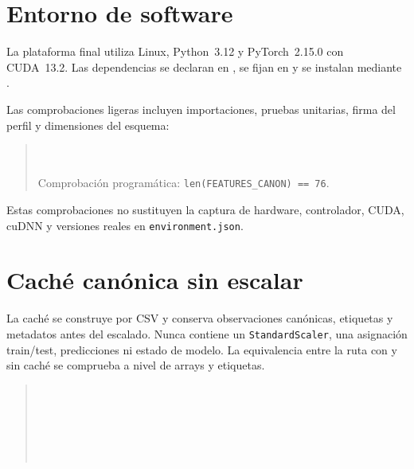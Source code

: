 \section{Entorno de software}

La plataforma final utiliza Linux, Python~3.12 y PyTorch~2.15.0 con CUDA~13.2. Las dependencias se declaran en , se fijan en  y se instalan mediante .

Las comprobaciones ligeras incluyen importaciones, pruebas unitarias, firma del perfil y dimensiones del esquema:

\begin{quote}\small
{}\\
\\
Comprobación programática: \texttt{len(FEATURES\_CANON) == 76}.
\end{quote}

Estas comprobaciones no sustituyen la captura de hardware, controlador, CUDA, cuDNN y versiones reales en \texttt{environment.json}.

\section{Caché canónica sin escalar}

La caché se construye por CSV y conserva observaciones canónicas, etiquetas y metadatos antes del escalado. Nunca contiene un \texttt{StandardScaler}, una asignación train/test, predicciones ni estado de modelo. La equivalencia entre la ruta con y sin caché se comprueba a nivel de arrays y etiquetas.

\begin{quote}\small
{}\\
\hspace*{1em}\\
\hspace*{1em}\\[3pt]
\\
\hspace*{1em}\\
\hspace*{1em}
\end{quote}

